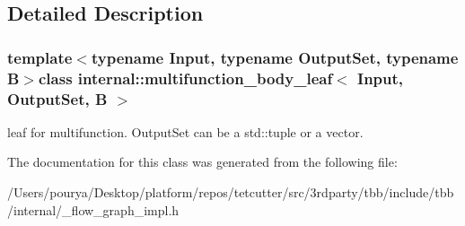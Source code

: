 \subsection{Detailed Description}
\subsubsection*{template$<$typename Input, typename Output\+Set, typename B$>$class internal\+::multifunction\+\_\+body\+\_\+leaf$<$ Input, Output\+Set, B $>$}

leaf for multifunction. Output\+Set can be a std\+::tuple or a vector. 

The documentation for this class was generated from the following file\+:\begin{DoxyCompactItemize}
\item 
/\+Users/pourya/\+Desktop/platform/repos/tetcutter/src/3rdparty/tbb/include/tbb/internal/\+\_\+flow\+\_\+graph\+\_\+impl.\+h\end{DoxyCompactItemize}
